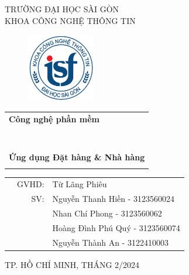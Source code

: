 \documentclass[a4paper]{article}
\begin{document}
\begin{titlepage}
\begin{center}
TRƯỜNG ĐẠI HỌC SÀI GÒN \\
KHOA CÔNG NGHỆ THÔNG TIN
\end{center}
\vspace{1cm}

\begin{figure}[h!]
\begin{center}
\includegraphics[width=3cm]{logoITSGU.png}
\end{center}
\end{figure}

\vspace{1cm}


\begin{center}
\begin{tabular}{c}
	\multicolumn{1}{l}{\textbf{{\Large Công nghệ phần mềm}}}\\
	~~\\
	\hline
	\\
	\multicolumn{1}{l}{\textbf{{\Large  }}}\\
	\\
	
	\textbf{{\Huge Ứng dụng Đặt hàng \& Nhà hàng}}\\
	\\
	\hline
\end{tabular}
\end{center}

\vspace{3cm}

\begin{table}[h]
\begin{tabular}{rrl}
\hspace{5 cm} & GVHD: &Từ Lãng Phiêu\\
& SV: & Nguyễn Thanh Hiền - 3123560024 \\
& & Nhan Chí Phong - 3123560062 \\
& & Hoàng Đình Phú Quý - 3123560074 \\
& & Nguyễn Thành An - 3122410003 \\
\end{tabular}
\vspace{1.5 cm}
\end{table}

\begin{center}

{\footnotesize TP. HỒ CHÍ MINH, THÁNG 2/2024}
\end{center}
\end{titlepage}
\end{document}
